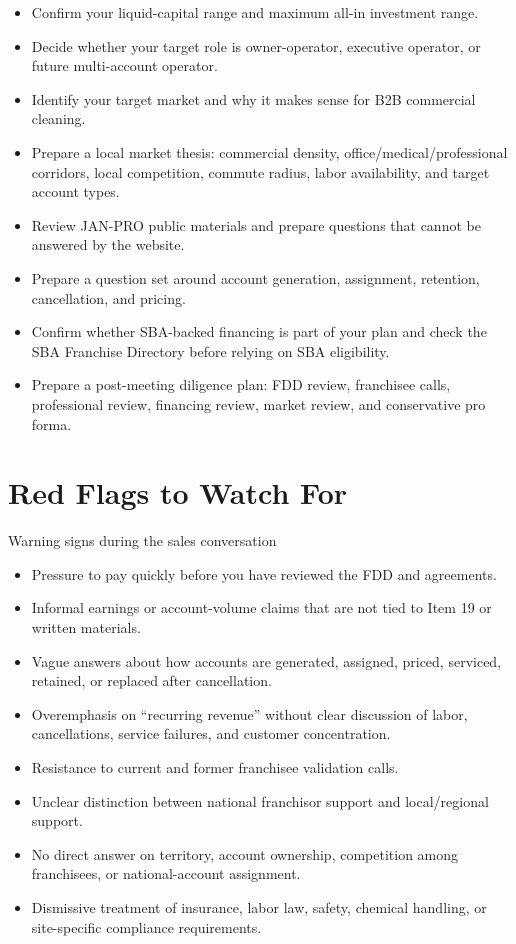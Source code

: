 \documentclass[11pt]{article}
\newcommand{\janpro}{JAN-PRO}
\begin{document}
\begin{itemize}
  \item Confirm your liquid-capital range and maximum all-in investment range.
  \item Decide whether your target role is owner-operator, executive operator, or future multi-account operator.
  \item Identify your target market and why it makes sense for B2B commercial cleaning.
  \item Prepare a local market thesis: commercial density, office/medical/professional corridors, local competition, commute radius, labor availability, and target account types.
  \item Review \janpro{} public materials and prepare questions that cannot be answered by the website.
  \item Prepare a question set around account generation, assignment, retention, cancellation, and pricing.
  \item Confirm whether SBA-backed financing is part of your plan and check the SBA Franchise Directory before relying on SBA eligibility.
  \item Prepare a post-meeting diligence plan: FDD review, franchisee calls, professional review, financing review, market review, and conservative pro forma.
\end{itemize}

\section{Red Flags to Watch For}

\begin{warningbox}{Warning signs during the sales conversation}
\begin{itemize}
  \item Pressure to pay quickly before you have reviewed the FDD and agreements.
  \item Informal earnings or account-volume claims that are not tied to Item 19 or written materials.
  \item Vague answers about how accounts are generated, assigned, priced, serviced, retained, or replaced after cancellation.
  \item Overemphasis on ``recurring revenue'' without clear discussion of labor, cancellations, service failures, and customer concentration.
  \item Resistance to current and former franchisee validation calls.
  \item Unclear distinction between national franchisor support and local/regional support.
  \item No direct answer on territory, account ownership, competition among franchisees, or national-account assignment.
  \item Dismissive treatment of insurance, labor law, safety, chemical handling, or site-specific compliance requirements.
\end{itemize}
\end{warningbox}
\end{document}
